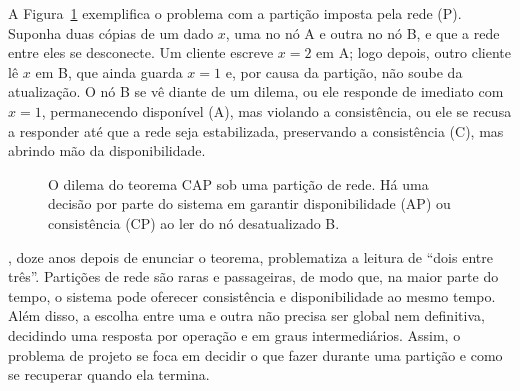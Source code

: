 A Figura~\ref{fig:cap} exemplifica o problema com a partição imposta pela rede (P). Suponha duas cópias de um dado $x$, uma no nó A e outra no nó B, e que a rede entre eles se desconecte. Um cliente escreve $x = 2$ em A; logo depois, outro cliente lê $x$ em B, que ainda guarda $x = 1$ e, por causa da partição, não soube da atualização. O nó B se vê diante de um dilema, ou ele responde de imediato com $x = 1$, permanecendo disponível (A), mas violando a consistência, ou ele se recusa a responder até que a rede seja estabilizada, preservando a consistência (C), mas abrindo mão da disponibilidade.

\begin{figure}[htb]
  \centering
  \caption[O dilema do teorema CAP sob uma partição de rede.]{%
    O dilema do teorema CAP sob uma partição de rede. Há uma decisão por parte do sistema em garantir disponibilidade (AP) ou consistência (CP) ao ler do nó desatualizado B.}
  \label{fig:cap}
\end{figure}

\citet{brewer2012}, doze anos depois de enunciar o teorema, problematiza a leitura de ``dois entre três''. Partições de rede são raras e passageiras, de modo que, na maior parte do tempo, o sistema pode oferecer consistência e disponibilidade ao mesmo tempo. Além disso, a escolha entre uma e outra não precisa ser global nem definitiva, decidindo uma resposta por operação e em graus intermediários. Assim, o problema de projeto se foca em decidir o que fazer durante uma partição e como se recuperar quando ela termina.

